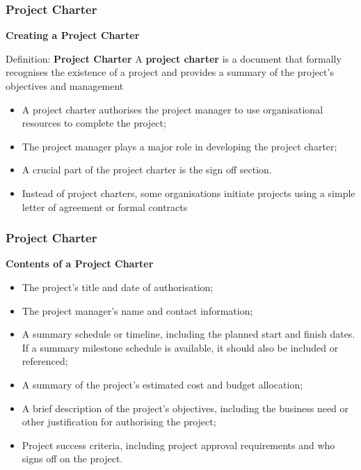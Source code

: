 \documentclass{beamer}
\begin{document}
\begin{frame}
\frametitle{Project Charter}
\textbf{Creating a Project Charter}
\vspace{0.25cm}
\begin{block}{Definition: \textbf{Project Charter}}
A \textbf{project charter} is a document that formally recognises the existence of a project and provides a summary of the project's objectives and management
\end{block}
\vspace{0.25cm}
\begin{itemize}
\item A project charter authorises the project manager to use organisational resources to complete the project;
\item The project manager plays a major role in developing the project charter;
\item A crucial part of the project charter is the sign off section.
\item Instead of project charters, some organisations initiate projects using a simple letter of agreement or formal contracts
\end{itemize}
\end{frame}

\begin{frame}
\frametitle{Project Charter}
\textbf{Contents of a Project Charter}
\vspace{0.5cm}
\begin{itemize}
\item The project's title and date of authorisation;
\item The project manager's name and contact information;
\item A summary schedule or timeline, including the planned start and finish dates. If a summary milestone schedule is available, it should also be included or referenced;
\item A summary of the project's estimated cost and budget allocation;
\item A brief description of the project's objectives, including the business need or other justification for authorising the project;
\item Project success criteria, including project approval requirements and who signs off on the project.
\end{itemize}
\end{frame}
\end{document}
